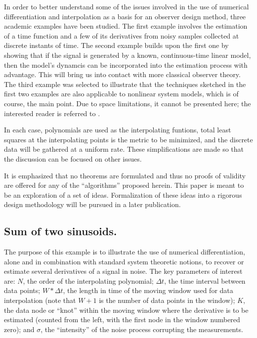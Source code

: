 In order to better understand some of the issues involved in the use of  
numerical differentiation and interpolation as a basis for an
observer design method, three academic
examples have been studied.  The first example
involves the estimation
of a time function and a few of its derivatives from noisy samples collected at
discrete instants of time.  The second example builds upon the first one
by showing that if the signal is generated by a known,
continuous-time linear model,
then the model's dynamcis can be incorporated into the estimation
process with advantage.  This will bring us into contact with more classical observer
theory.  The third example was selected to illustrate that the techniques sketched in the
first two examples are
also applicable to nonlinear system models, which is of course, the main
point.  Due to space limitations, it cannot be presented here; the interested
reader is referred to \cite{UMTechReport93}. 


In each case, polynomials are used as the interpolating
funtions, total least squares at the interpolating points is the 
metric to be minimized, and the discrete data will be gathered at a uniform rate.
These simplifications are made so that the discussion can be focused on other issues.

It is emphasized that no theorems are formulated and thus no proofs of validity
are
offered for any of the ``algorithms'' proposed herein.  This paper is meant to be an
exploration of a set of ideas.  Formalization of these ideas into a rigorous design
methodology will be pursued in a later publication.  

\subsection{Sum of two sinusoids.}

The purpose of this example is to illustrate the use of numerical
differentiation, alone and 
in combination with standard system theoretic notions,
to recover or estimate several derivatives of a signal in noise.  The key
parameters of interest are: $N$, the order of the interpolating polynomial;
$\Delta t$, the time interval between data points;
$W * \Delta t$, the length in time of the moving window used for data interpolation
(note that $W + 1$ is the number of data points in the window);
$K$, the data node or ``knot'' within the moving window 
where the derivative is to be estimated (counted from the left, with
the first node in the window numbered zero); and $\sigma$, the ``intensity'' 
of the noise process corrupting the measurements.

